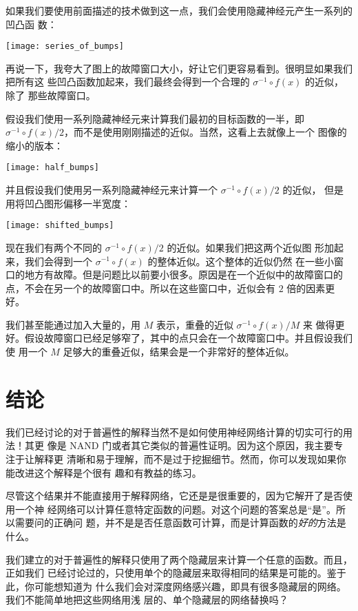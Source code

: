 如果我们要使用前面描述的技术做到这一点，我们会使用隐藏神经元产生一系列的凹凸函
数：
\begin{center}
  \texttt{[image: series\_of\_bumps]}
\end{center}

再说一下，我夸大了图上的故障窗口大小，好让它们更容易看到。很明显如果我们把所有这
些凹凸函数加起来，我们最终会得到一个合理的 $\sigma^{-1} \circ f(x)$ 的近似，除了
那些故障窗口。

假设我们使用一系列隐藏神经元来计算我们最初的目标函数的一半，即
$\sigma^{-1} \circ f(x) / 2$，而不是使用刚刚描述的近似。当然，这看上去就像上一个
图像的缩小的版本：
\begin{center}
  \texttt{[image: half\_bumps]}
\end{center}

并且假设我们使用另一系列隐藏神经元来计算一个 $\sigma^{-1} \circ f(x) / 2$ 的近似，
但是用将凹凸图形偏移一半宽度：
\begin{center}
  \texttt{[image: shifted\_bumps]}
\end{center}

现在我们有两个不同的 $\sigma^{-1} \circ f(x) / 2$ 的近似。如果我们把这两个近似图
形加起来，我们会得到一个 $\sigma^{-1} \circ f(x)$ 的整体近似。这个整体的近似仍然
在一些小窗口的地方有故障。但是问题比以前要小很多。原因是在一个近似中的故障窗口的
点，不会在另一个的故障窗口中。所以在这些窗口中，近似会有 $2$ 倍的因素更好。

我们甚至能通过加入大量的，用 $M$ 表示，重叠的近似 $\sigma^{-1} \circ f(x) / M$ 来
做得更好。假设故障窗口已经足够窄了，其中的点只会在一个故障窗口中。并且假设我们使
用一个 $M$ 足够大的重叠近似，结果会是一个非常好的整体近似。

\section{结论}
\label{sec:conclusion}

我们已经讨论的对于普遍性的解释当然不是如何使用神经网络计算的切实可行的用法！其更
像是 {\serif NAND} 门或者其它类似的普遍性证明。因为这个原因，我主要专注于让解释更
清晰和易于理解，而不是过于挖掘细节。然而，你可以发现如果你能改进这个解释是个很有
趣和有教益的练习。

尽管这个结果并不能直接用于解释网络，它还是是很重要的，因为它解开了是否使用一个神
经网络可以计算任意特定函数的问题。对这个问题的答案总是“是”。所以需要问的正确问
题，并不是是否任意函数可计算，而是计算函数的\emph{好的}方法是什么。

我们建立的对于普遍性的解释只使用了两个隐藏层来计算一个任意的函数。而且，正如我们
已经讨论过的，只使用单个的隐藏层来取得相同的结果是可能的。鉴于此，你可能想知道为
什么我们会对深度网络感兴趣，即具有很多隐藏层的网络。我们不能简单地把这些网络用浅
层的、单个隐藏层的网络替换吗？

